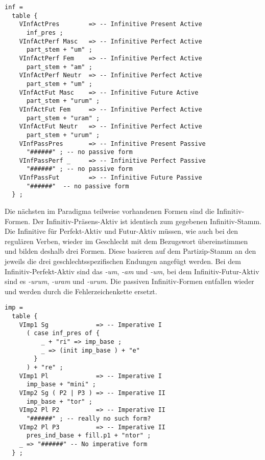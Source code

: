 \begin{lstlisting}[float=h!tp,caption={Ausschnitt aus der Funktion \texttt{mkDeponent} um Infinitiv-Verbformen zu bilden (vgl. \textbf{ResLat.gf})},label={GF-Res-MkDeponent-Inf},basicstyle=\small]
inf = 
  table {
    VInfActPres        => -- Infinitive Present Active
      inf_pres ;
    VInfActPerf Masc   => -- Infinitive Perfect Active
      part_stem + "um" ;
    VInfActPerf Fem    => -- Infinitive Perfect Active
      part_stem + "am" ;
    VInfActPerf Neutr  => -- Infinitive Perfect Active
      part_stem + "um" ;
    VInfActFut Masc    => -- Infinitive Future Active
      part_stem + "urum" ;
    VInfActFut Fem     => -- Infinitive Perfect Active
      part_stem + "uram" ; 
    VInfActFut Neutr   => -- Infinitive Perfect Active
      part_stem + "urum" ;
    VInfPassPres       => -- Infinitive Present Passive
      "######" ; -- no passive form
    VInfPassPerf _     => -- Infinitive Perfect Passive
      "######" ; -- no passive form
    VInfPassFut        => -- Infinitive Future Passive
      "######"  -- no passive form
  } ;
\end{lstlisting}
Die nächsten im Paradigma teilweise vorhandenen Formen sind die Infinitiv-Formen. Der Infinitiv-Präsens-Aktiv ist identisch zum gegebenen Infinitiv-Stamm. Die Infinitive für Perfekt-Aktiv und Futur-Aktiv müssen, wie auch bei den regulären Verben, wieder im Geschlecht mit dem Bezugswort übereinstimmen und bilden deshalb drei Formen. Diese basieren auf dem Partizip-Stamm an den jeweils die drei geschlechtsspezifischen Endungen angefügt werden. Bei dem Infinitiv-Perfekt-Aktiv sind das \textit{-um}, \textit{-am} und \textit{-um}, bei dem Infinitiv-Futur-Aktiv sind es \textit{-urum}, \textit{-uram} und \textit{-urum}. Die passiven Infinitiv-Formen entfallen wieder und werden durch die Fehlerzeichenkette ersetzt. \par
\begin{lstlisting}[float=h!tp,caption={Ausschnitt aus der Funktion \texttt{mkDeponent} um Imperativ-Verbformen zu bilden (vgl. \textbf{ResLat.gf})},label={GF-Res-MkDeponent-Imp},basicstyle=\small]
imp = 
  table {
    VImp1 Sg             => -- Imperative I
      ( case inf_pres of {
          _ + "ri" => imp_base ;
          _ => (init imp_base ) + "e" 
        }
      ) + "re" ;
    VImp1 Pl             => -- Imperative I
      imp_base + "mini" ;
    VImp2 Sg ( P2 | P3 ) => -- Imperative II
      imp_base + "tor" ;
    VImp2 Pl P2          => -- Imperative II
      "######" ; -- really no such form?
    VImp2 Pl P3          => -- Imperative II
      pres_ind_base + fill.p1 + "ntor" ;
    _ => "######" -- No imperative form
  } ;
\end{lstlisting}
